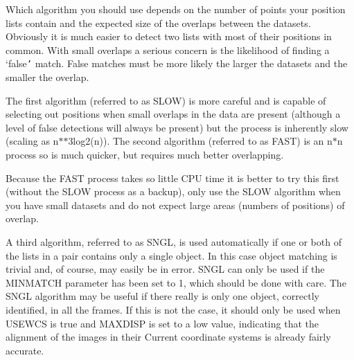 \documentclass[twoside,11pt]{article}
\renewcommand{\_}{\texttt{\symbol{95}}}
\begin{document}
{{      Which algorithm you should use depends on the number of points
      your position lists contain and the expected size of the overlaps
      between the datasets. Obviously it is much easier to detect two
      lists with most of their positions in common. With small overlaps
      a serious concern is the likelihood of finding a `false{\tt '} match.
      False matches must be more likely the larger the datasets and the
      smaller the overlap.

      The first algorithm (referred to as SLOW) is more careful and is
      capable of selecting out positions when small overlaps in the
      data are present (although a level of false detections will
      always be present) but the process is inherently slow (scaling as
      n$*$$*$3log2(n)).  The second algorithm (referred to as FAST) is an
      n$*$n process so is much quicker, but requires much better
      overlapping.

      Because the FAST process takes so little CPU time it is better to
      try this first (without the SLOW process as a backup), only use
      the SLOW algorithm when you have small datasets and do not
      expect large areas (numbers of positions) of overlap.

      A third algorithm, referred to as SNGL, is used automatically if
      one or both of the lists in a pair contains only a single object.
      In this case object matching is trivial and, of course, may
      easily be in error.  SNGL can only be used if the MINMATCH
      parameter has been set to 1, which should be done with care.  The
      SNGL algorithm may be useful if there really is only one object,
      correctly identified, in all the frames.  If this is not the
      case, it should only be used when USEWCS is true and MAXDISP is
      set to a low value, indicating that the alignment of the images in
      their Current coordinate systems is already fairly accurate.

}}
\end{document}
